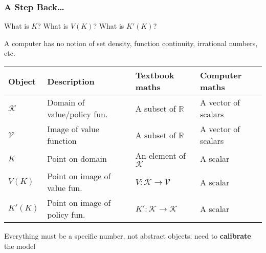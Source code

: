 \documentclass[10pt, aspectratio=1610, handout]{beamer}
\begin{document}
  \begin{frame}
    \frametitle{A Step Back\dots}

    What is $K$? \hfill
    What is $V(K)$? \hfill
    What is $K'(K)$?

    \vfill\pause

    A computer has no notion of set density, function continuity, irrational numbers, etc.

    \vfill\pause

    \begin{table}
      \centering
      \begin{tabular}{llll}
        \toprule
        Object        & Description                   & Textbook maths                     & Computer maths      \\
        \midrule
        $\mathcal{K}$ & Domain of value/policy fun.   & A subset of $\mathbb{R}$           & A vector of scalars \\
        $\mathcal{V}$ & Image of value function       & A subset of $\mathbb{R}$           & A vector of scalars \\
        $K$           & Point on domain               & An element of $\mathcal{K}$        & A scalar            \\
        $V(K)$        & Point on image of value fun.  & $V : \mathcal{K} \to \mathcal{V}$  & A scalar            \\
        $K'(K)$       & Point on image of policy fun. & $K' : \mathcal{K} \to \mathcal{K}$ & A scalar            \\
        \bottomrule
      \end{tabular}
    \end{table}

    \vfill\pause

    Everything must be a specific number, not abstract objects: need to \textbf{calibrate} the model

  \end{frame}
\end{document}
